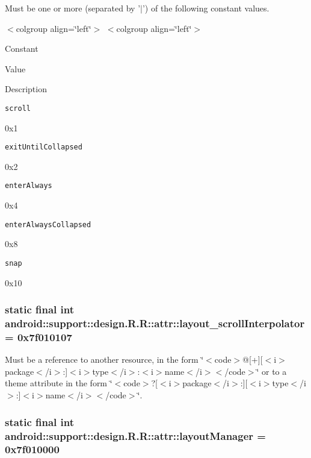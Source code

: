 Must be one or more (separated by '$|$') of the following constant values. \begin{TabularC}{0}
\hline
\end{TabularC}
$<$colgroup align=\char`\"{}left\char`\"{}$>$ $<$colgroup align=\char`\"{}left\char`\"{}$>$ 

Constant

Value

Description 

{\tt scroll}

0x1

{\tt exitUntilCollapsed}

0x2

{\tt enterAlways}

0x4

{\tt enterAlwaysCollapsed}

0x8

{\tt snap}

0x10\hypertarget{classandroid_1_1support_1_1design_1_1_r_1_1attr_e980625f28bfab00665988f4a71cc4f0}{
\subsubsection[{layout\_\-scrollInterpolator}]{\setlength{\rightskip}{0pt plus 5cm}static final int android::support::design.R.R::attr::layout\_\-scrollInterpolator = 0x7f010107}}
\label{classandroid_1_1support_1_1design_1_1_r_1_1attr_e980625f28bfab00665988f4a71cc4f0}


Must be a reference to another resource, in the form \char`\"{}$<$code$>$@\mbox{[}+\mbox{]}\mbox{[}$<$i$>$package$<$/i$>$:\mbox{]}$<$i$>$type$<$/i$>$:$<$i$>$name$<$/i$>$$<$/code$>$\char`\"{} or to a theme attribute in the form \char`\"{}$<$code$>$?\mbox{[}$<$i$>$package$<$/i$>$:\mbox{]}\mbox{[}$<$i$>$type$<$/i$>$:\mbox{]}$<$i$>$name$<$/i$>$$<$/code$>$\char`\"{}. \hypertarget{classandroid_1_1support_1_1design_1_1_r_1_1attr_e04b6506762815d9e20c6b73e467a1fb}{
\subsubsection[{layoutManager}]{\setlength{\rightskip}{0pt plus 5cm}static final int android::support::design.R.R::attr::layoutManager = 0x7f010000}}
\label{classandroid_1_1support_1_1design_1_1_r_1_1attr_e04b6506762815d9e20c6b73e467a1fb}


